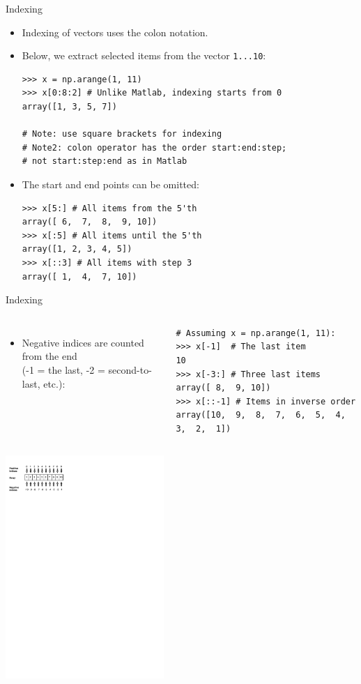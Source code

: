 \documentclass[10pt, aspectratio=169]{beamer} %
\begin{document}
\begin{frame}[fragile]
 {Indexing}
\begin{itemize}
\item Indexing of vectors uses the colon notation.
\item Below, we extract selected items from the vector \verb+1...10+:
\begin{lstlisting}
>>> x = np.arange(1, 11)
>>> x[0:8:2] # Unlike Matlab, indexing starts from 0
array([1, 3, 5, 7])

# Note: use square brackets for indexing
# Note2: colon operator has the order start:end:step;
# not start:step:end as in Matlab
\end{lstlisting}
\item The start and end points can be omitted:
\begin{lstlisting}
>>> x[5:] # All items from the 5'th
array([ 6,  7,  8,  9, 10])
>>> x[:5] # All items until the 5'th
array([1, 2, 3, 4, 5])
>>> x[::3] # All items with step 3
array([ 1,  4,  7, 10])
\end{lstlisting}
\end{itemize}
\end{frame}

\begin{frame}[fragile,allowframebreaks=0.8]
 {Indexing}
\begin{columns}
\begin{itemize}
\item Negative indices are counted from the end\\ (-1 = the last, -2 = second-to-last, etc.):
\end{itemize}
\begin{lstlisting}
# Assuming x = np.arange(1, 11):
>>> x[-1]  # The last item
10
>>> x[-3:] # Three last items
array([ 8,  9, 10])
>>> x[::-1] # Items in inverse order
array([10,  9,  8,  7,  6,  5,  4,  3,  2,  1])
\end{lstlisting}
\end{columns}
\centerline{\includegraphics[width=0.45\textwidth]{Indexing.pdf}}
\end{frame}
\end{document}
